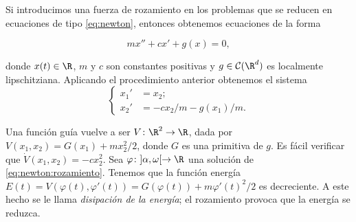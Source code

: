 \documentclass{article}
\begin{document}
\begin{ex}
  Si introducimos una fuerza de rozamiento en los problemas que se reducen en ecuaciones de tipo
  \eqref{eq:newton}, entonces obtenemos ecuaciones de la forma

  \begin{equation}
    \label{eq:newton:rozamiento}
    m x'' + cx' + g(x) = 0,
  \end{equation}

  donde $x(t) \in \R$, $m$ y $c$ son constantes positivas y $g \in \mathcal{C}(\R^d)$ es localmente
  lipschitziana. Aplicando el procedimiento anterior obtenemos el sistema
  \begin{equation}
    \label{eq:newton:rozamiento:sis}
    \begin{cases}
      x_1' & = x_2; \\
      x_2' & = -c x_2 /m - g(x_1) / m.
    \end{cases}
  \end{equation}

  Una función guía vuelve a ser $V \colon \R^2 \to \R$, dada por $V(x_1,x_2) = G(x_1) + m x_2^2/2$,
  donde $G$ es una primitiva de $g$. Es fácil verificar que $\dot{V}(x_1,x_2) = - c x_2^2$. Sea
  $\varphi\colon ]\alpha, \omega[ \to \R$ una solución de \eqref{eq:newton:rozamiento}. Tenemos que
  la función energía $E(t) = V(\varphi(t), \varphi'(t)) = G(\varphi(t)) + m \varphi'(t)^2/2$ es
  decreciente. A este hecho se le llama \emph{disipación de la energía}; el rozamiento provoca que
  la energía se reduzca.
\end{ex}
\end{document}
